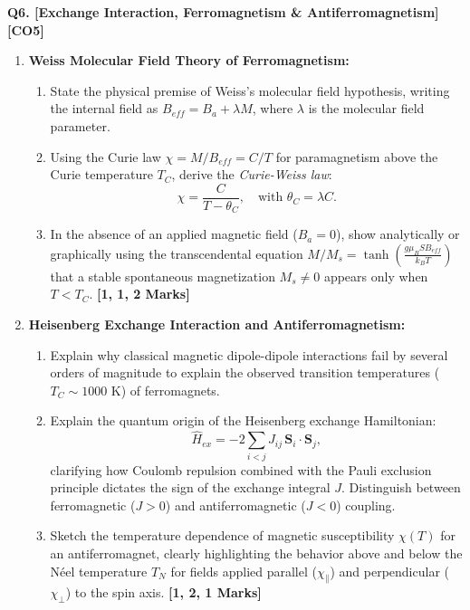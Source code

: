 \documentclass[11pt,a4paper]{article}
\begin{document}
\vspace{4pt}
\noindent\textbf{Q6. [Exchange Interaction, Ferromagnetism \& Antiferromagnetism]} \hfill \textbf{[CO5]}
\begin{enumerate}[label=(\alph*),leftmargin=1.8em,itemsep=4pt]
    \item \textbf{Weiss Molecular Field Theory of Ferromagnetism:}
    \begin{enumerate}[label=(\roman*),itemsep=1.5pt]
        \item State the physical premise of Weiss's molecular field hypothesis, writing the internal field as $B_{eff} = B_a + \lambda M$, where $\lambda$ is the molecular field parameter.
        \item Using the Curie law $\chi = M / B_{eff} = C / T$ for paramagnetism above the Curie temperature $T_C$, derive the \textit{Curie-Weiss law}:
        \[
        \chi = \frac{C}{T - \theta_C}, \quad \text{with } \theta_C = \lambda C.
        \]
        \item In the absence of an applied magnetic field ($B_a = 0$), show analytically or graphically using the transcendental equation $M/M_s = \tanh\left(\frac{g\mu_B S B_{eff}}{k_B T}\right)$ that a stable spontaneous magnetization $M_s \neq 0$ appears only when $T < T_C$. \hfill\textbf{[1, 1, 2 Marks]}
    \end{enumerate}

    \item \textbf{Heisenberg Exchange Interaction and Antiferromagnetism:}
    \begin{enumerate}[label=(\roman*),itemsep=1.5pt]
        \item Explain why classical magnetic dipole-dipole interactions fail by several orders of magnitude to explain the observed transition temperatures ($T_C \sim 1000\text{ K}$) of ferromagnets.
        \item Explain the quantum origin of the Heisenberg exchange Hamiltonian:
        \[
        \hat{H}_{ex} = -2 \sum_{i < j} J_{ij}\, \mathbf{S}_i \cdot \mathbf{S}_j,
        \]
        clarifying how Coulomb repulsion combined with the Pauli exclusion principle dictates the sign of the exchange integral $J$. Distinguish between ferromagnetic ($J > 0$) and antiferromagnetic ($J < 0$) coupling.
        \item Sketch the temperature dependence of magnetic susceptibility $\chi(T)$ for an antiferromagnet, clearly highlighting the behavior above and below the N\'eel temperature $T_N$ for fields applied parallel ($\chi_\parallel$) and perpendicular ($\chi_\perp$) to the spin axis. \hfill\textbf{[1, 2, 1 Marks]}
    \end{enumerate}
\end{enumerate}
\end{document}
